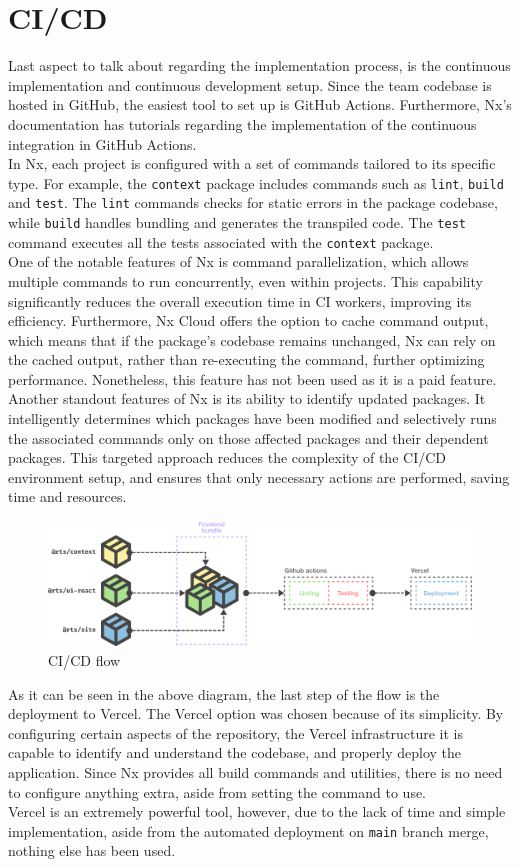 \documentclass[./memory.tex]{subfiles}
\begin{document}
\section{CI/CD}
Last aspect to talk about regarding the implementation process, is the
continuous implementation and continuous development setup. Since the team
codebase is hosted in GitHub, the easiest tool to set up is GitHub Actions.
Furthermore, Nx's documentation has tutorials\cite{nx-github-actions} regarding
the implementation of the continuous integration in GitHub Actions.
\\[8pt]
In Nx, each project is configured with a set of commands tailored to its
specific type. For example, the \texttt{context} package includes commands such
as \texttt{lint}, \texttt{build} and \texttt{test}. The \texttt{lint} commands
checks for static errors in the package codebase, while \texttt{build} handles
bundling and generates the transpiled code. The \texttt{test} command executes
all the tests associated with the \texttt{context} package.
\\
One of the notable features of Nx is command parallelization, which allows
multiple commands to run concurrently, even within projects. This capability
significantly reduces the overall execution time in CI workers, improving its
efficiency. Furthermore, Nx Cloud offers the option to cache command output,
which means that if the package's codebase remains unchanged, Nx can rely on the
cached output, rather than re-executing the command, further optimizing
performance. Nonetheless, this feature has not been used as it is a paid
feature.
\\
Another standout features of Nx is its ability to identify updated packages. It
intelligently determines which packages have been modified and selectively runs
the associated commands only on those affected packages and their dependent
packages. This targeted approach reduces the complexity of the CI/CD
environment setup, and ensures that only necessary actions are performed, saving
time and resources.
\begin{figure}[H]
	\centering
	\includegraphics[width=\textwidth]{./assets/deployment.png}
	\caption{CI/CD flow}
\end{figure}
As it can be seen in the above diagram, the last step of the flow is the
deployment to Vercel. The Vercel option was chosen because of its simplicity. By
configuring certain aspects of the repository, the Vercel infrastructure it is
capable to identify and understand the codebase, and properly deploy the
application. Since Nx provides all build commands and utilities, there is no
need to configure anything extra, aside from setting the command to use.
\\
Vercel is an extremely powerful tool, however, due to the lack of time and
simple implementation, aside from the automated deployment on \texttt{main}
branch merge, nothing else has been used.
\end{document}
